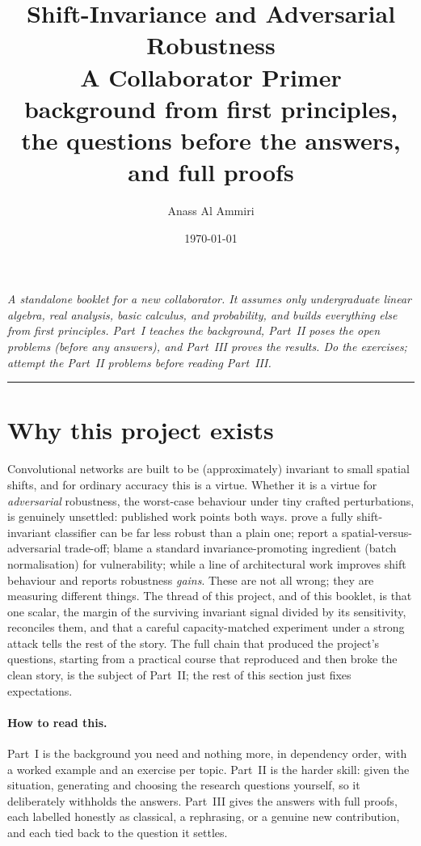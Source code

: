 \documentclass[11pt]{article}
\title{\textbf{Shift-Invariance and Adversarial Robustness}\\[3pt]
\large A Collaborator Primer\\[4pt]
\normalsize background from first principles, the questions before the answers, and full proofs}
\author{Anass Al Ammiri}
\date{\today}
\theoremstyle{plain}
\theoremstyle{definition}
\theoremstyle{remark}
\begin{document}
\maketitle

\begin{center}\small\itshape
A standalone booklet for a new collaborator. It assumes only undergraduate linear algebra, real analysis, basic
calculus, and probability, and builds everything else from first principles. Part~I teaches the background, Part~II
poses the open problems (before any answers), and Part~III proves the results. Do the exercises; attempt the
Part~II problems before reading Part~III.
\end{center}

\medskip\hrule\medskip
\tableofcontents
\newpage

\section{Why this project exists}
\label{sec:why}
Convolutional networks are built to be (approximately) invariant to small spatial shifts, and for ordinary accuracy
this is a virtue. Whether it is a virtue for \emph{adversarial} robustness, the worst-case behaviour under tiny
crafted perturbations, is genuinely unsettled: published work points both ways. \citet{ge2021shift} prove a fully
shift-invariant classifier can be far less robust than a plain one; \citet{kamath2021} report a spatial-versus-adversarial
trade-off; \citet{galloway2019} blame a standard invariance-promoting ingredient (batch normalisation) for
vulnerability; while a line of architectural work \citep{zhang2019blurpool,sahagokhale2024} improves shift behaviour
and reports robustness \emph{gains}. These are not all wrong; they are measuring different things. The thread of this
project, and of this booklet, is that one scalar, the margin of the surviving invariant signal divided by its
sensitivity, reconciles them, and that a careful capacity-matched experiment under a strong attack tells the rest of
the story. The full chain that produced the project's questions, starting from a practical course that reproduced and
then broke the clean story, is the subject of Part~II; the rest of this section just fixes expectations.

\paragraph{How to read this.} Part~I is the background you need and nothing more, in dependency order, with a worked
example and an exercise per topic. Part~II is the harder skill: given the situation, generating and choosing the
research questions yourself, so it deliberately withholds the answers. Part~III gives the answers with full proofs,
each labelled honestly as classical, a rephrasing, or a genuine new contribution, and each tied back to the question
it settles.
\newpage
\end{document}
